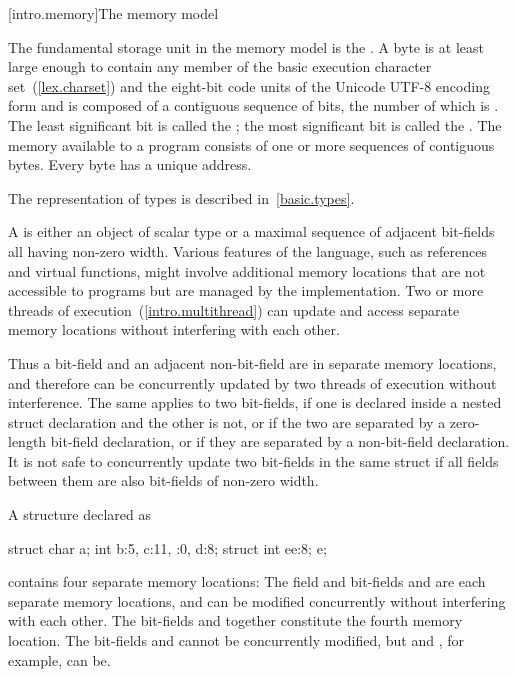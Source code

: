 [intro.memory]{The \Cpp memory model}

\pnum
{}%
The fundamental storage unit in the \Cpp memory model is the
.
A byte is at least large enough to contain any member of the basic
%
execution character set~(\ref{lex.charset})
and the eight-bit code units of the Unicode UTF-8 encoding form
and is composed of a contiguous sequence of
bits, the number of which is . The least
significant bit is called the ; the most
significant bit is called the . The memory
available to a \Cpp program consists of one or more sequences of
contiguous bytes. Every byte has a unique address.

\pnum
\enternote The representation of types is described
in~\ref{basic.types}. \exitnote

\pnum
A  is either an object of scalar type or a maximal
sequence of adjacent bit-fields all having non-zero width. \enternote Various
features of the language, such as references and virtual functions, might
involve additional memory locations that are not accessible to programs but are
managed by the implementation. \exitnote Two or more threads of
execution~(\ref{intro.multithread}) can update and access separate memory
locations without interfering with each other.

\pnum
\enternote Thus a bit-field and an adjacent non-bit-field are in separate memory
locations, and therefore can be concurrently updated by two threads of execution
without interference. The same applies to two bit-fields, if one is declared
inside a nested struct declaration and the other is not, or if the two are
separated by a zero-length bit-field declaration, or if they are separated by a
non-bit-field declaration. It is not safe to concurrently update two bit-fields
in the same struct if all fields between them are also bit-fields of non-zero
width. \exitnote

\pnum
\enterexample A structure declared as

\begin{codeblock}
struct {
  char a;
  int b:5,
  c:11,
  :0,
  d:8;
  struct {int ee:8;} e;
}
\end{codeblock}

contains four separate memory locations: The field  and bit-fields
 and  are each separate memory locations, and can be
modified concurrently without interfering with each other. The bit-fields
 and  together constitute the fourth memory location. The
bit-fields  and  cannot be concurrently modified, but
 and , for example, can be. \exitexample%

